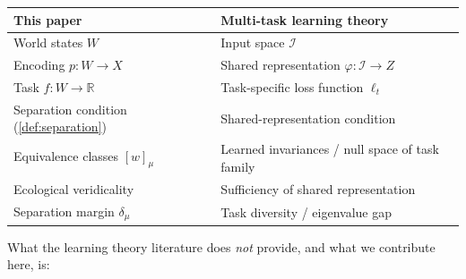\documentclass[12pt]{article}
\newcommand{\dmu}{\delta_\mu}
\newcommand{\R}{\mathbb{R}}
\begin{document}
\begin{table}[ht]
\centering
\begin{tabular}{@{}ll@{}}
\toprule
This paper & Multi-task learning theory \\
\midrule
World states $W$ & Input space $\mathcal{I}$ \\
Encoding $p\colon W \to X$ & Shared representation $\varphi\colon \mathcal{I} \to Z$ \\
Task $f\colon W \to \R$ & Task-specific loss function $\ell_t$ \\
Separation condition (\cref{def:separation}) & Shared-representation condition \\
Equivalence classes $[w]_\mu$ & Learned invariances / null space of task family \\
Ecological veridicality & Sufficiency of shared representation \\
Separation margin $\dmu$ & Task diversity / eigenvalue gap \\
\bottomrule
\end{tabular}
\end{table}

What the learning theory literature does \emph{not} provide, and what we contribute here, is:
\end{document}
